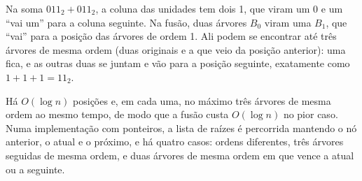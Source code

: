 \begin{intuicao}
Na soma $011_2+011_2$, a coluna das unidades tem dois 1, que viram um 0 e um ``vai um'' para a coluna seguinte. Na fusão, duas árvores $B_0$ viram uma $B_1$, que ``vai'' para a posição das árvores de ordem 1. Ali podem se encontrar até três árvores de mesma ordem (duas originais e a que veio da posição anterior): uma fica, e as outras duas se juntam e vão para a posição seguinte, exatamente como $1+1+1=11_2$.
\end{intuicao}

Há $O(\log n)$ posições e, em cada uma, no máximo três árvores de mesma ordem ao mesmo tempo, de modo que a fusão custa $O(\log n)$ no pior caso. Numa implementação com ponteiros, a lista de raízes é percorrida mantendo o nó anterior, o atual e o próximo, e há quatro casos: ordens diferentes, três árvores seguidas de mesma ordem, e duas árvores de mesma ordem em que vence a atual ou a seguinte.

